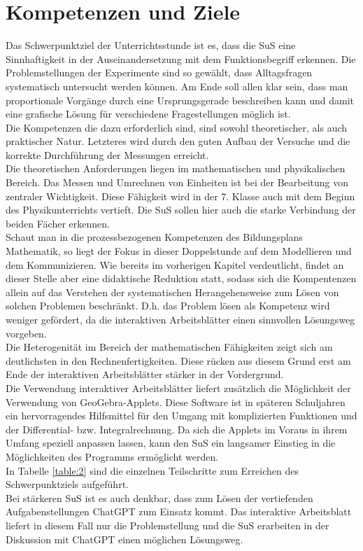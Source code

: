 \documentclass[../main.tex]{subfiles}
\begin{document}
\section{Kompetenzen und Ziele}
Das Schwerpunktziel der Unterrichtsstunde ist es, dass die SuS eine Sinnhaftigkeit in der Auseinandersetzung mit dem Funktionsbegriff erkennen. Die Problemstellungen der Experimente sind so gewählt, dass Alltagsfragen systematisch untersucht werden können. Am Ende soll allen klar sein, dass man proportionale Vorgänge durch eine Ursprungsgerade beschreiben kann und damit eine grafische Lösung für verschiedene Fragestellungen möglich ist.\\ 
Die Kompetenzen die dazu erforderlich sind, sind sowohl theoretischer, als auch praktischer Natur. Letzteres wird durch den guten Aufbau der Versuche und die korrekte Durchführung der Messungen erreicht. \\
Die theoretischen Anforderungen liegen im mathematischen und physikalischen Bereich. Das Messen und Umrechnen von Einheiten ist bei der Bearbeitung von zentraler Wichtigkeit. Diese Fähigkeit wird in der 7. Klasse auch mit dem Beginn des Physikunterrichts vertieft. Die SuS sollen hier auch die starke Verbindung der beiden Fächer erkennen.\\
Schaut man in die prozessbezogenen Kompetenzen des Bildungsplans Mathematik, so liegt der Fokus in dieser Doppelstunde auf dem Modellieren und dem Kommunizieren. Wie bereits im vorherigen Kapitel verdeutlicht, findet an dieser Stelle aber eine didaktische Reduktion statt, sodass sich die Kompentenzen allein auf das Verstehen der systematischen Herangehensweise zum Lösen von solchen Problemen beschränkt. D.h. das Problem lösen als Kompetenz wird weniger gefördert, da die interaktiven Arbeitsblätter einen sinnvollen Lösungsweg vorgeben.\\
Die Heterogenität im Bereich der mathematischen Fähigkeiten zeigt sich am deutlichsten in den Rechnenfertigkeiten. Diese rücken aus diesem Grund erst am Ende der interaktiven Arbeitsblätter stärker in der Vordergrund.\\
Die Verwendung interaktiver Arbeitsblätter liefert zusätzlich die Möglichkeit der Verwendung von GeoGebra-Applets. Diese Software ist in späteren Schuljahren ein hervorragendes Hilfsmittel für den Umgang mit komplizierten Funktionen und der Differential- bzw. Integralrechnung. Da sich die Applets im Voraus in ihrem Umfang speziell anpassen lassen, kann den SuS ein langsamer Einstieg in die Möglichkeiten des Programms ermöglicht werden.\\
In Tabelle \ref{table:2} sind die einzelnen Teilschritte zum Erreichen des Schwerpunktziels aufgeführt.\\
Bei stärkeren SuS ist es auch denkbar, dass zum Lösen der vertiefenden Aufgabenstellungen ChatGPT zum Einsatz kommt. Das interaktive Arbeitsblatt liefert in diesem Fall nur die Problemstellung und die SuS erarbeiten in der Diskussion mit ChatGPT einen möglichen Lösungsweg.\\
\end{document}
